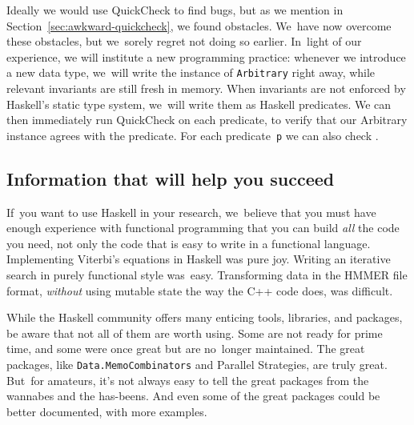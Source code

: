 \documentclass[preprint,nonatbib,blockstyle,times]{sigplanconf}
\newcommand\secref[1]{Section~\ref{sec:#1}}
\newcommand\seclabel[1]{\label{sec:#1}}
\begin{document}
Ideally we would use QuickCheck to find bugs, but as we mention in
\secref{awkward-quickcheck}, we found obstacles.
We~have now overcome these obstacles, but
we~sorely regret not doing so earlier.
In~light of our experience, we will institute a new programming practice:
whenever we introduce a new data type,
we~will write the instance of
\texttt{Arbitrary} right away, while
relevant invariants are still fresh in memory.
When invariants are not enforced by Haskell's static type system,
we~will write them as Haskell predicates.
We can then immediately run QuickCheck on each predicate, to verify
that our Arbitrary instance agrees with the predicate.
For each predicate~\texttt{p} we can also check
.






\subsection{Information that will help you succeed}

If~you want to use Haskell in your research, we~believe that you must
have enough experience with functional programming that you can build
\emph{all} the code you need, not only the code that is easy to write
in a functional language.
Implementing Viterbi's equations in Haskell was pure joy.
Writing an iterative search in purely functional style was~easy.
Transforming data in the HMMER file format, \emph{without}
using mutable state the way the C++ code does, was difficult.

\seclabel{penumbra}

While the Haskell community offers many
enticing tools, libraries, and packages,
be aware that
not all of them are worth using.
Some are not ready for prime time, and some were once great but are
no~longer maintained.
The great packages, like \texttt{Data.MemoCombinators} and Parallel
Strategies, are truly great.
But~for amateurs, it's not always easy to tell the great packages from the wannabes
and the has-beens.
And even some of the great packages could be better documented, with
more examples.

\end{document}
